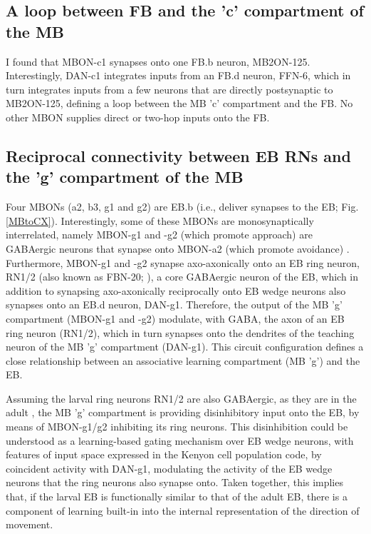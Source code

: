    \subsection{A loop between FB and the 'c' compartment of the MB}
    
    I found that MBON-c1 synapses onto one FB.b neuron, MB2ON-125.
    Interestingly, DAN-c1 integrates inputs from an FB.d neuron, FFN-6, which in turn integrates inputs from a few neurons that are directly postsynaptic to MB2ON-125, defining a loop between the MB 'c' compartment and the FB.
    No other MBON supplies direct or two-hop inputs onto the FB.

    \subsection{Reciprocal connectivity between EB RNs and the 'g' compartment of the MB}

    Four MBONs (a2, b3, g1 and g2) are EB.b (i.e., deliver synapses to the EB; Fig. \ref{MBtoCX}). Interestingly, some of these MBONs are monosynaptically interrelated, namely MBON-g1 and -g2 (which promote approach) are GABAergic neurons that synapse onto MBON-a2 (which promote avoidance) \citep{eschbach2021circuits}.
    Furthermore, MBON-g1 and -g2 synapse axo-axonically onto an EB ring neuron, RN1/2 (also known as FBN-20; \citep{eschbach2021circuits}), a core GABAergic neuron of the EB, which in addition to synapsing axo-axonically reciprocally onto EB wedge neurons also synapses onto an EB.d neuron, DAN-g1.
    Therefore, the output of the MB 'g' compartment (MBON-g1 and -g2) modulate, with GABA, the axon of an EB ring neuron (RN1/2), which in turn synapses onto the dendrites of the teaching neuron of the MB 'g' compartment (DAN-g1).  This circuit configuration defines a close relationship between an associative learning compartment (MB 'g') and the EB.

    Assuming the larval ring neurons RN1/2 are also GABAergic, as they are in the adult \citep{hanesch1989neuronal}, the MB 'g' compartment is providing disinhibitory input onto the EB, by means of MBON-g1/g2 inhibiting its ring neurons.
    This disinhibition could be understood as a learning-based gating mechanism over EB wedge neurons, with features of input space expressed in the Kenyon cell population code, by coincident activity with DAN-g1, modulating the activity of the EB wedge neurons that the ring neurons also synapse onto.
    Taken together, this implies that, if the larval EB is functionally similar to that of the adult EB, there is a component of learning built-in into the internal representation of the direction of movement.
    
